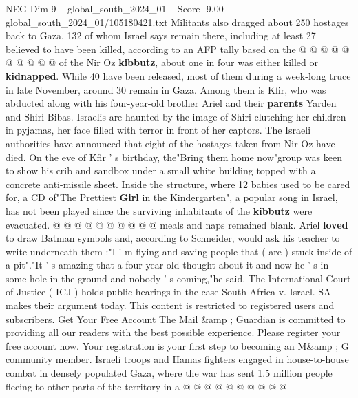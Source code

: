 \begin{textsample}{NEG Dim 9 – global\_south\_2024\_01 – Score -9.00 – global\_south\_2024\_01/105180421.txt}
Militants also dragged about 250 hostages back to Gaza, 132 of whom Israel says remain there, including at least 27 believed to have been killed, according to an AFP tally based on the @ @ @ @ @ @ @ @ @ @ of the Nir Oz \textbf{kibbutz}, about one in four was either killed or \textbf{kidnapped}.
While 40 have been released, most of them during a week-long truce in late November, around 30 remain in Gaza.
Among them is Kfir, who was abducted along with his four-year-old brother Ariel and their \textbf{parents} Yarden and Shiri Bibas.
Israelis are haunted by the image of Shiri clutching her children in pyjamas, her face filled with terror in front of her captors.
The Israeli authorities have announced that eight of the hostages taken from Nir Oz have died.
On the eve of Kfir ' s birthday, the"Bring them home now"group was keen to show his crib and sandbox under a small white building topped with a concrete anti-missile sheet.
Inside the structure, where 12 babies used to be cared for, a CD of"The Prettiest \textbf{Girl} in the Kindergarten", a popular song in Israel, has not been played since the surviving inhabitants of the \textbf{kibbutz} were evacuated. @ @ @ @ @ @ @ @ @ @ meals and naps remained blank.
Ariel \textbf{loved} to draw Batman symbols and, according to Schneider, would ask his teacher to write underneath them :"I ' m flying and saving people that ( are ) stuck inside of a pit"."It ' s amazing that a four year old thought about it and now he ' s in some hole in the ground and nobody ' s coming,"he said.
The International Court of Justice ( ICJ ) holds public hearings in the case South Africa v.
Israel.
SA makes their argument today.
This content is restricted to registered users and subscribers.
Get Your Free Account The Mail \&amp ; Guardian is committed to providing all our readers with the best possible experience.
Please register your free account now.
Your registration is your first step to becoming an M\&amp ; G community member.
Israeli troops and Hamas fighters engaged in house-to-house combat in densely populated Gaza, where the war has sent 1.5 million people fleeing to other parts of the territory in a @ @ @ @ @ @ @ @ @ @

\end{textsample}

